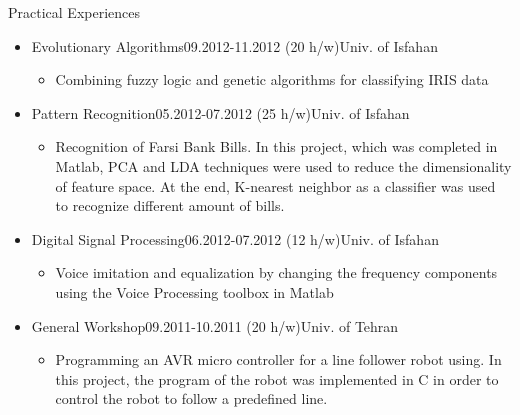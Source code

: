 \documentclass{resume} %
\begin{document}
\begin{rSection}{Practical Experiences}

\begin{itemize}
\item{
\begin{rSubsection}	{Evolutionary Algorithms}{09.2012-11.2012 (20 h/w)}{Univ. of Isfahan}{}
	\begin{itemize}
 \item {Combining fuzzy logic and genetic algorithms for classifying IRIS data} 
\end{itemize}
\end{rSubsection}}

\item{
\begin{rSubsection}{Pattern Recognition}{05.2012-07.2012 (25 h/w)}{Univ. of Isfahan}{}
	\begin{itemize} 
		\item {Recognition of Farsi Bank Bills. In this project, which was completed in Matlab, PCA and LDA techniques were used to reduce the dimensionality of feature space. At the end, K-nearest neighbor as a classifier was used to recognize different amount of bills.} 
		\end{itemize}
\end{rSubsection}}

\item{
\begin{rSubsection}{Digital Signal Processing}{06.2012-07.2012 (12 h/w)}{Univ. of Isfahan}{}
	\begin{itemize}
		\item {Voice imitation and equalization by changing the frequency components using the Voice Processing toolbox in Matlab } 
		\end{itemize}
\end{rSubsection}}

\item{
\begin{rSubsection}{General Workshop}{09.2011-10.2011 (20 h/w)}{Univ. of Tehran}{}
	\begin{itemize}
		\item {Programming an AVR micro controller for a line follower robot using. In this project, the program of the robot was implemented in C in order to control the robot to follow a predefined line.}\vspace{-0.2cm}
		\end{itemize}
\end{rSubsection}}


\end{itemize}
\end{rSection}
\end{document}

